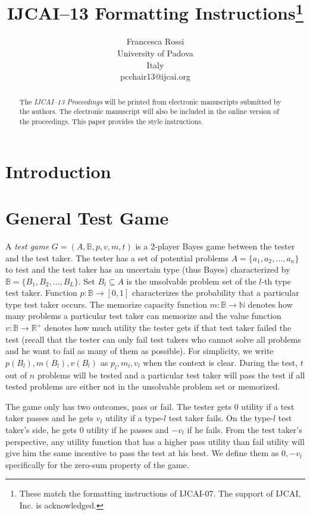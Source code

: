 \documentclass{article}
\title{IJCAI--13 Formatting Instructions\thanks{These match the formatting instructions of IJCAI-07. The support of IJCAI, Inc. is acknowledged.}}
\author{Francesca Rossi \\
University of Padova\\
Italy \\
pcchair13@ijcai.org}
\begin{document}
\maketitle

\begin{abstract}
  The {\it IJCAI--13 Proceedings} will be printed from electronic
  manuscripts submitted by the authors. The electronic manuscript will
  also be included in the online version of the proceedings. This paper
  provides the style instructions.
\end{abstract}

\section{Introduction}

\section{General Test Game}

A \emph{test game} $G = (A, \mathbb B, p, v, m, t)$ is a 2-player Bayes game
between the tester and the test taker. The tester has a set of potential
problems $A = \{a_1, a_2, \ldots, a_n\}$ to test and the test taker has an
uncertain type (thus Bayes) characterized by $\mathbb B = \{B_1, B_2, \ldots,
B_L\}$. Set $B_l \subseteq A$ is the unsolvable problem set of the $l$-th type
test taker.  Function $p: \mathbb B \rightarrow [0,1]$ characterizes the
probability that a particular type test taker occurs.  The memorize capacity
function $m: \mathbb B \rightarrow \mathbb N$ denotes how many problems a
particular test taker can memorize and the value function $v: \mathbb B
\rightarrow \mathbb R^+$ denotes how much utility the tester gets if that test
taker failed the test (recall that the tester can only fail test takers who
cannot solve all problems and he want to fail as many of them as possible). For
simplicity, we write $p(B_l), m(B_l), v(B_l)$ as $p_l, m_l, v_l$ when the
context is clear.  During the test, $t$ out of $n$ problems will be tested and
a particular test taker will pass the test if all tested problems are either
not in the unsolvable problem set or memorized.  

The game only has two outcomes, pass or fail. The tester gets $0$ utility if a
test taker passes and he gets $v_l$ utility if a type-$l$ test taker fails. On
the type-$l$ test taker's side, he gets $0$ utility if he passes and $-v_l$ if
he fails. From the test taker's perspective, any utility function that has a
higher pass utility than fail utility will give him the same incentive to pass
the test at his best. We define them as $0, -v_l$ specifically for the zero-sum
property of the game.
\end{document}
